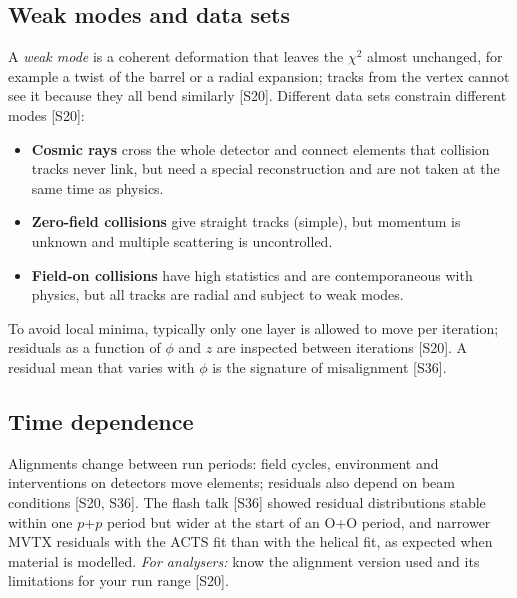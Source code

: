 \documentclass[11pt,letterpaper]{article}
\begin{document}
\subsection{Weak modes and data sets}
A \emph{weak mode} is a coherent deformation that leaves the $\chi^2$ almost unchanged, for example a twist of the barrel or a radial expansion; tracks from the vertex cannot see it because they all bend similarly [S20].
Different data sets constrain different modes [S20]:
\begin{itemize}
\item \textbf{Cosmic rays} cross the whole detector and connect elements that collision tracks never link, but need a special reconstruction and are not taken at the same time as physics.
\item \textbf{Zero-field collisions} give straight tracks (simple), but momentum is unknown and multiple scattering is uncontrolled.
\item \textbf{Field-on collisions} have high statistics and are contemporaneous with physics, but all tracks are radial and subject to weak modes.
\end{itemize}
To avoid local minima, typically only one layer is allowed to move per iteration; residuals as a function of $\phi$ and $z$ are inspected between iterations [S20].
A residual mean that varies with $\phi$ is the signature of misalignment [S36].

\subsection{Time dependence}
Alignments change between run periods: field cycles, environment and interventions on detectors move elements; residuals also depend on beam conditions [S20, S36].
The flash talk [S36] showed residual distributions stable within one $p$+$p$ period but wider at the start of an O+O period, and narrower MVTX residuals with the ACTS fit than with the helical fit, as expected when material is modelled.
\emph{For analysers:} know the alignment version used and its limitations for your run range [S20].
\end{document}
